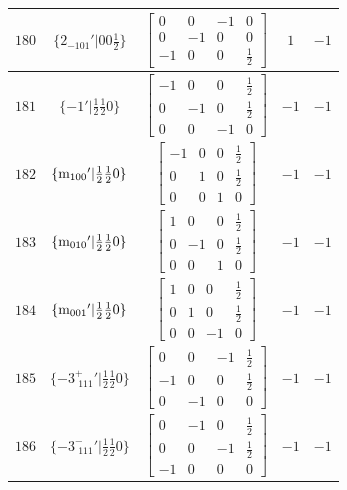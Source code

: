 \documentclass[fleqn,8pt]{jsarticle}
\begin{document}
\begin{longtable}{ccccc}
$ 180 $ & $ \{2{}_{-101}{}'|0 0 \frac{1}{2}\} $ & $ \begin{bmatrix} 0 & 0 & -1 & 0 \\ 0 & -1 & 0 & 0 \\ -1 & 0 & 0 & \frac{1}{2} \end{bmatrix} $ & $ 1 $ & $ -1 $ \\ \hline
$ 181 $ & $ \{-1{}'|\frac{1}{2} \frac{1}{2} 0\} $ & $ \begin{bmatrix} -1 & 0 & 0 & \frac{1}{2} \\ 0 & -1 & 0 & \frac{1}{2} \\ 0 & 0 & -1 & 0 \end{bmatrix} $ & $ -1 $ & $ -1 $ \\ \hline
$ 182 $ & $ \{{\rm m}_{100}{}'|\frac{1}{2} \frac{1}{2} 0\} $ & $ \begin{bmatrix} -1 & 0 & 0 & \frac{1}{2} \\ 0 & 1 & 0 & \frac{1}{2} \\ 0 & 0 & 1 & 0 \end{bmatrix} $ & $ -1 $ & $ -1 $ \\ \hline
$ 183 $ & $ \{{\rm m}_{010}{}'|\frac{1}{2} \frac{1}{2} 0\} $ & $ \begin{bmatrix} 1 & 0 & 0 & \frac{1}{2} \\ 0 & -1 & 0 & \frac{1}{2} \\ 0 & 0 & 1 & 0 \end{bmatrix} $ & $ -1 $ & $ -1 $ \\ \hline
$ 184 $ & $ \{{\rm m}_{001}{}'|\frac{1}{2} \frac{1}{2} 0\} $ & $ \begin{bmatrix} 1 & 0 & 0 & \frac{1}{2} \\ 0 & 1 & 0 & \frac{1}{2} \\ 0 & 0 & -1 & 0 \end{bmatrix} $ & $ -1 $ & $ -1 $ \\ \hline
$ 185 $ & $ \{-3^{+}_{\,\,111}{}'|\frac{1}{2} \frac{1}{2} 0\} $ & $ \begin{bmatrix} 0 & 0 & -1 & \frac{1}{2} \\ -1 & 0 & 0 & \frac{1}{2} \\ 0 & -1 & 0 & 0 \end{bmatrix} $ & $ -1 $ & $ -1 $ \\ \hline
$ 186 $ & $ \{-3^{-}_{\,\,111}{}'|\frac{1}{2} \frac{1}{2} 0\} $ & $ \begin{bmatrix} 0 & -1 & 0 & \frac{1}{2} \\ 0 & 0 & -1 & \frac{1}{2} \\ -1 & 0 & 0 & 0 \end{bmatrix} $ & $ -1 $ & $ -1 $ \\ \hline

\end{longtable}
\end{document}
